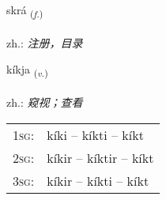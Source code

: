 \documentclass[frontgrid, backgrid]{flacards}\usepackage[]{graphicx}\usepackage[]{xcolor}
\begin{document}
\renewcommand{\flhead}{\vskip5pt \fboxsep=0pt {\small\bfseries\footnotesize Nafnorð | 名词}}
\renewcommand{\fcfoot}{\vskip5pt \fboxsep=0pt \hspace{2pt}{\small\bfseries\footnotesize 3K}}

\renewcommand{\blhead}{\vskip5pt {\small\bfseries\footnotesize Nafnorð | 名词 }}
\renewcommand{\bcfoot}{\vskip5pt \hspace{2pt}{\small\bfseries\footnotesize 3K}}


{skrá \small{\textsubscript{(\textit{f.})}} \\[1ex] %
\textphonetic{[skrauː]} \\
zh.: \emph{注册，目录} \\  [2ex]
\renewcommand*{\arraystretch}{0.8}
}

\renewcommand{\flhead}{\vskip5pt \fboxsep=0pt {\small\bfseries\footnotesize Sagnorð | 动词}}
\renewcommand{\fcfoot}{\vskip5pt \fboxsep=0pt \hspace{2pt}{\small\bfseries\footnotesize 3K}}

\renewcommand{\blhead}{\vskip5pt {\small\bfseries\footnotesize Sagnorð | 动词 }}
\renewcommand{\bcfoot}{\vskip5pt \hspace{2pt}{\small\bfseries\footnotesize 3K}}


{kíkja \small{\textsubscript{(\textit{v.})}} \\[1ex] %
\textphonetic{[cʰiːca]} \\
zh.: \emph{窥视；查看} \\  [2ex]
\renewcommand*{\arraystretch}{0.8}
\begin{tabular}{p{1cm}l}
\textsc{1sg}: & kíki -- kíkti -- kíkt \\ 
\textsc{2sg}: & kíkir -- kíktir -- kíkt \\ 
\textsc{3sg}: & kíkir -- kíkti -- kíkt \\ 
\end{tabular}
}
\end{document}
